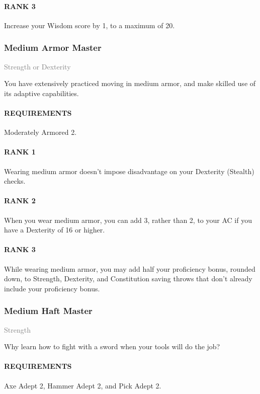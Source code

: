\paragraph{RANK 3} Increase your Wisdom score by 1, to a maximum of 20.

\subsubsection{Medium Armor Master} \label{feat::mediumarmormaster}
\small{\textcolor{gray}{Strength or Dexterity}}

\normalsize
You have extensively practiced moving in medium armor, and make skilled use of its adaptive capabilities.
\paragraph{REQUIREMENTS} Moderately Armored 2.
\paragraph{RANK 1} Wearing medium armor doesn't impose disadvantage on your Dexterity (Stealth) checks.
\paragraph{RANK 2} When you wear medium armor, you can add 3, rather than 2, to your AC if you have a Dexterity of 16 or higher.
\paragraph{RANK 3} While wearing medium armor, you may add half your proficiency bonus, rounded down, to Strength, Dexterity, and Constitution saving throws that don't already include your proficiency bonus.

\subsubsection{Medium Haft Master} \label{feat::mediumhaftmaster}
\small{\textcolor{gray}{Strength}}

\normalsize
Why learn how to fight with a sword when your tools will do the job?
\paragraph{REQUIREMENTS} Axe Adept 2, Hammer Adept 2, and Pick Adept 2.
